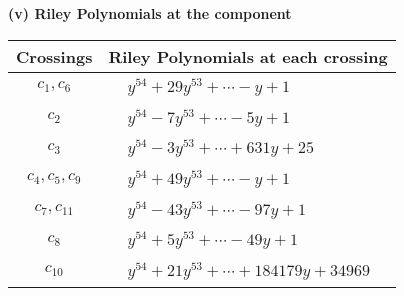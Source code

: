 \documentclass[1p]{elsarticle_modified}
\theoremstyle{definition}
\begin{document}
\newpage\renewcommand{\arraystretch}{1}
\flushleft \textbf{(v) Riley Polynomials at the component}\newline \\
\begin{tabular}{m{50pt}|m{274pt}}
Crossings & \hspace{64pt}Riley Polynomials at each crossing \\
\hline $$\begin{aligned}c_{1},c_{6}\end{aligned}$$&$\begin{aligned}
&y^{54}+29 y^{53}+\cdots- y+1
\end{aligned}$\\
\hline $$\begin{aligned}c_{2}\end{aligned}$$&$\begin{aligned}
&y^{54}-7 y^{53}+\cdots-5 y+1
\end{aligned}$\\
\hline $$\begin{aligned}c_{3}\end{aligned}$$&$\begin{aligned}
&y^{54}-3 y^{53}+\cdots+631 y+25
\end{aligned}$\\
\hline $$\begin{aligned}c_{4},c_{5},c_{9}\end{aligned}$$&$\begin{aligned}
&y^{54}+49 y^{53}+\cdots- y+1
\end{aligned}$\\
\hline $$\begin{aligned}c_{7},c_{11}\end{aligned}$$&$\begin{aligned}
&y^{54}-43 y^{53}+\cdots-97 y+1
\end{aligned}$\\
\hline $$\begin{aligned}c_{8}\end{aligned}$$&$\begin{aligned}
&y^{54}+5 y^{53}+\cdots-49 y+1
\end{aligned}$\\
\hline $$\begin{aligned}c_{10}\end{aligned}$$&$\begin{aligned}
&y^{54}+21 y^{53}+\cdots+184179 y+34969
\end{aligned}$\\
\hline
\end{tabular}\\~\\
\end{document}
